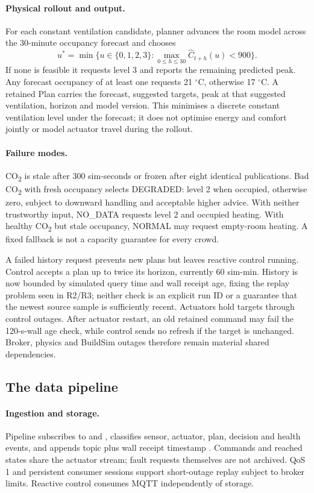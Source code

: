 \documentclass[11pt,a4paper]{article}
\begin{document}
\paragraph{Physical rollout and output.}
For each constant ventilation candidate, planner advances the room model across the 30-minute occupancy forecast and chooses
\begin{equation}
u^*=\min\{u\in\{0,1,2,3\}:\max_{0\leq h\leq30}\widehat C_{t+h}(u)<900\}.
\end{equation}
If none is feasible it requests level 3 and reports the remaining predicted peak. Any forecast occupancy of at least one requests 21 $^\circ$C, otherwise 17 $^\circ$C. A retained Plan carries the forecast, suggested targets, peak at that suggested ventilation, horizon and model version. This minimises a discrete constant ventilation level under the forecast; it does not optimise energy and comfort jointly or model actuator travel during the rollout.

\paragraph{Failure modes.}
CO\textsubscript{2} is stale after 300 sim-seconds or frozen after eight identical publications. Bad CO\textsubscript{2} with fresh occupancy selects DEGRADED: level 2 when occupied, otherwise zero, subject to downward handling and acceptable higher advice. With neither trustworthy input, NO\_DATA requests level 2 and occupied heating. With healthy CO\textsubscript{2} but stale occupancy, NORMAL may request empty-room heating. A fixed fallback is not a capacity guarantee for every crowd.

A failed history request prevents new plans but leaves reactive control running. Control accepts a plan up to twice its horizon, currently 60 sim-min. History is now bounded by simulated query time and wall receipt age, fixing the replay problem seen in R2/R3; neither check is an explicit run ID or a guarantee that the newest source sample is sufficiently recent. Actuators hold targets through control outages. After actuator restart, an old retained command may fail the 120-s-wall age check, while control sends no refresh if the target is unchanged. Broker, physics and BuildSim outages therefore remain material shared dependencies.

\subsection{The data pipeline}
\paragraph{Ingestion and storage.}
Pipeline subscribes to \protect{} and \protect{}, classifies sensor, actuator, plan, decision and health events, and appends topic plus wall receipt timestamp \protect{}. Commands and reached states share the actuator stream; fault requests themselves are not archived. QoS 1 and persistent consumer sessions support short-outage replay subject to broker limits. Reactive control consumes MQTT independently of storage.
\end{document}
